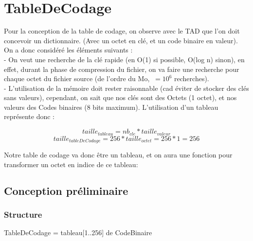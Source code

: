     \section*{TableDeCodage}
Pour la conception de la table de codage, on observe avec le TAD que l’on doit concevoir un dictionnaire. (Avec un octet en clé, et un code binaire en valeur). On a donc considéré les éléments suivants : \\

        	- On veut une recherche de la clé rapide (en O(1) si possible, O(log n) sinon), en effet, durant la phase de compression du fichier, on va  faire une recherche pour chaque octet du fichier source (de l’ordre du Mo, $ ~= 10^6 $ recherches). \\
            
            - L'utilisation de la mémoire doit rester raisonnable (cad éviter de stocker des clés sans valeurs), cependant, on sait que nos clés sont des Octets (1 octet), et nos valeurs des Codes binaires (8 bits maximum). L’utilisation d’un tableau représente donc : 
            
	$$ taille_{tableau} = nb_{cle} * taille_{valeur} $$
	$$ taille_{tableDeCodage} = 256 * taille_{octet} = 256 * 1 = 256 $$

    Notre table de codage va donc être un tableau, et on aura une fonction pour transformer un octet en indice de ce tableau: \\
    
    \subsection*{Conception préliminaire}
    \subsubsection*{Structure}
        TableDeCodage = tableau[1..256] de CodeBinaire

